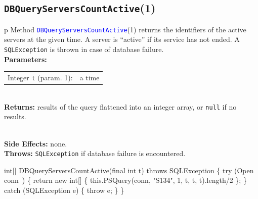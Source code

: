 \subsection{\texttt{DBQueryServersCountActive}(1)}
\begin{tabular}{p{\textwidth}}
\toprule
{}
Method \textcolor{blue}{{\tt{}\protect{}DBQueryServersCountActive}}(1) returns the identifiers
of the active servers at the given time. A server is ``active'' if its
service has not ended.
A {\tt{}SQLException} is thrown in case of database failure.\\
\midrule
\textbf{Parameters:} \\
\begin{tabular}{lp{116mm}}
Integer {\tt{}t} (param. 1):&a time
\end{tabular}\\
\textbf{Returns:} results of the query flattened into an integer array, or
{\tt{}null} if no results.

\\
\textbf{Side Effects:} none.\\
\textbf{Throws:} {\tt{}SQLException} if database failure is encountered.\\
\bottomrule
\end{tabular}
\nwenddocs{}\endmoddef{}
int[] DBQueryServersCountActive(final int t) throws SQLException \{
  try (\LA{}Open \code{}conn\edoc{}~{\nwtagstyle{}}\RA{}) \{
    return new int[] \{ this.PSQuery(conn, "S134", 1, t, t, t).length/2 \};
  \} catch (SQLException e) \{
    throw e;
  \}
\}
\eatline
{}\nwendcode{}\endmoddef{}
